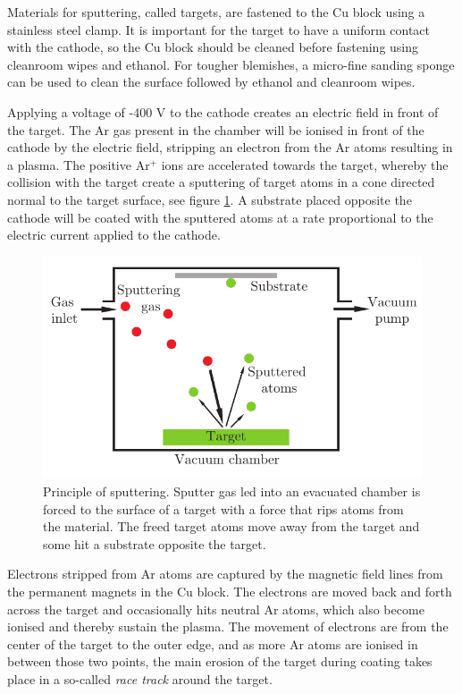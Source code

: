 Materials for sputtering, called targets, are fastened to the Cu block using a stainless steel clamp. It is important for the target to have a uniform contact with the cathode, so the Cu block should be cleaned before fastening using cleanroom wipes and ethanol. For tougher blemishes, a micro-fine sanding sponge can be used to clean the surface followed by ethanol and cleanroom wipes.

Applying a voltage of -400 V to the cathode creates an electric field in front of the target. The Ar gas present in the chamber will be ionised in front of the cathode by the electric field, stripping an electron from the Ar atoms resulting in a plasma. The positive Ar$^+$ ions are accelerated towards the target, whereby the collision with the target create a sputtering of target atoms in a cone directed normal to the target surface, see figure \ref{fig:sputtering}. A substrate placed opposite the cathode will be coated with the sputtered atoms at a rate proportional to the electric current applied to the cathode.

\begin{figure}[htbp]
  \centering  \includegraphics[width=0.6\linewidth]{figures/chamber/sputtering.pdf}
  \caption{\footnotesize Principle of sputtering. Sputter gas led into an evacuated chamber is forced to the surface of a target with a force that rips atoms from the material. The freed target atoms move away from the target and some hit a substrate opposite the target. }
  \label{fig:sputtering}
\end{figure}

Electrons stripped from Ar atoms are captured by the magnetic field lines from the permanent magnets in the Cu block. The electrons are moved back and forth across the target and occasionally hits neutral Ar atoms, which also become ionised and thereby sustain the plasma. The movement of electrons are from the center of the target to the outer edge, and as more Ar atoms are ionised in between those two points, the main erosion of the target during coating takes place in a so-called \emph{race track} around the target.
%
%

